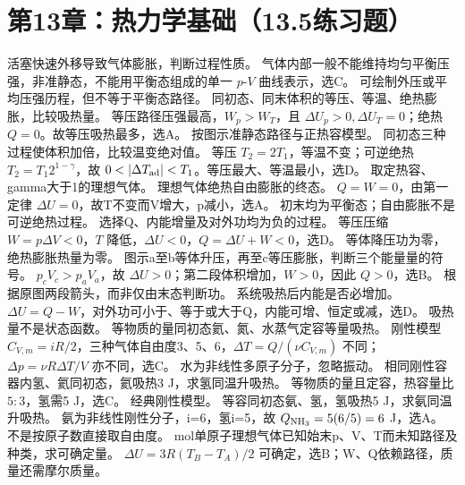 \section{第13章：热力学基础（13.5练习题）}
\problemtext 活塞快速外移导致气体膨胀，判断过程性质。
\workings 气体内部一般不能维持均匀平衡压强，非准静态，不能用平衡态组成的单一 $p$-$V$ 曲线表示，选C。
\crosscheck 可绘制外压或平均压强历程，但不等于平衡态路径。
\problemtext 同初态、同末体积的等压、等温、绝热膨胀，比较吸热量。
\workings 等压路径压强最高，$W_p>W_T$，且 $\Delta U_p>0,\Delta U_T=0$；绝热 $Q=0$。故等压吸热最多，选A。
\crosscheck 按图示准静态路径与正热容模型。
\problemtext 同初态三种过程使体积加倍，比较温变绝对值。
\workings 等压 $T_2=2T_1$，等温不变；可逆绝热 $T_2=T_1 2^{1-\gamma}$，故 $0<|\Delta T_{\rm ad}|<T_1$。等压最大、等温最小，选D。
\crosscheck 取定热容、gamma大于1的理想气体。
\problemtext 理想气体绝热自由膨胀的终态。
\workings $Q=W=0$，由第一定律 $\Delta U=0$，故T不变而V增大，p减小，选A。
\crosscheck 初末均为平衡态；自由膨胀不是可逆绝热过程。
\problemtext 选择Q、内能增量及对外功均为负的过程。
\workings 等压压缩 $W=p\Delta V<0$，$T$ 降低，$\Delta U<0$，$Q=\Delta U+W<0$，选D。
\crosscheck 等体降压功为零，绝热膨胀热量为零。
\problemtext 图示a至b等体升压，再至c等压膨胀，判断三个能量量的符号。
\workings $p_cV_c>p_aV_a$，故 $\Delta U>0$；第二段体积增加，$W>0$，因此 $Q>0$，选B。
\crosscheck 根据原图两段箭头，而非仅由末态判断功。
\problemtext 系统吸热后内能是否必增加。
\workings $\Delta U=Q-W$，对外功可小于、等于或大于Q，内能可增、恒定或减，选D。
\crosscheck 吸热量不是状态函数。
\problemtext 等物质的量同初态氦、氮、水蒸气定容等量吸热。
\workings 刚性模型 $C_{V,m}=iR/2$，三种气体自由度3、5、6，$\Delta T=Q/(\nu C_{V,m})$ 不同；$\Delta p=\nu R\Delta T/V$ 亦不同，选C。
\crosscheck 水为非线性多原子分子，忽略振动。
\problemtext 相同刚性容器内氢、氦同初态，氦吸热3 J，求氢同温升吸热。
\workings 等物质的量且定容，热容量比 $5:3$，氢需5 J，选C。
\crosscheck 经典刚性模型。
\problemtext 等容同初态氨、氢，氢吸热5 J，求氨同温升吸热。
\workings 氨为非线性刚性分子，i=6，氢i=5，故 $Q_{\rm NH_3}=5(6/5)=6$ J，选A。
\crosscheck 不是按原子数直接取自由度。
 mol单原子理想气体已知始末p、V、T而未知路径及种类，求可确定量。
\workings $\Delta U=3R(T_B-T_A)/2$ 可确定，选B；W、Q依赖路径，质量还需摩尔质量。

